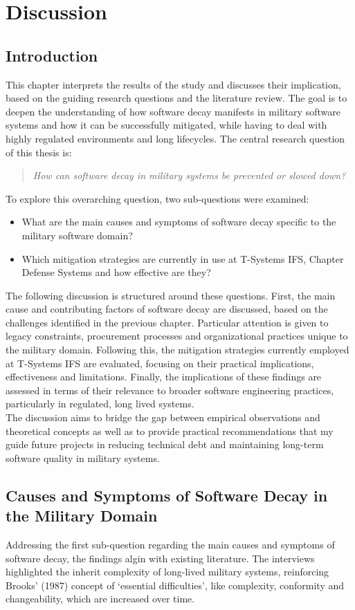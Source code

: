 \section{Discussion}
\subsection{Introduction}
This chapter interprets the results of the study and discusses their implication, based on the guiding research questions and the literature review. The goal is to deepen the understanding of how software decay manifests in military software systems
and how it can be successfully mitigated, while having to deal with highly regulated environments and long lifecycles.
The central research question of this thesis is:
\begin{quote}
\textit{How can software decay in military systems be prevented or slowed down?}
\end{quote}
To explore this overarching question, two sub-questions were examined:
\begin{itemize}
    \item What are the main causes and symptoms of software decay specific to the military software domain?
    \item Which mitigation strategies are currently in use at T-Systems IFS, Chapter Defense Systems and how effective are they?
\end{itemize}
The following discussion is structured around these questions. First, the main cause and contributing factors of software decay are discussed, based on the challenges identified in the previous chapter. Particular attention is given to legacy constraints, procurement processes and organizational practices unique to the military domain.
Following this, the mitigation strategies currently employed at T-Systems IFS are evaluated, focusing on their practical implications, effectiveness and limitations. Finally, the implications of these findings are assessed in terms of their relevance to broader software engineering practices, particularly in regulated, long lived systems.\\
The discussion aims to bridge the gap between empirical observations and theoretical concepts as well as to provide practical recommendations that my guide future projects in reducing technical debt and maintaining long-term software quality in military systems.\\

\subsection{Causes and Symptoms of Software Decay in the Military Domain}
Addressing the first sub-question regarding the main causes and symptoms of software decay, the findings algin with existing literature. The interviews highlighted the inherit complexity of long-lived military systems, reinforcing Brooks' (1987) concept of `essential difficulties', like complexity, conformity and changeability, which are increased over time.\\

